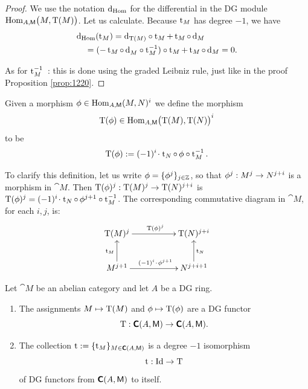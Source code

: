 \begin{proof}
We use the notation $\mathrm{d}_{\mathrm{Hom}}$ for the differential in the DG module \lb 
$\operatorname{Hom}_{A, \operatorname{\mathsf{M}}} \bigl( M, \operatorname{T}(M) \bigr)$. 
Let us calculate. Because $\operatorname{t}_M$ has degree $-1$, we have
\[ \begin{aligned}
& \mathrm{d}_{\mathrm{Hom}}(\operatorname{t}_M) = 
\mathrm{d}_{\operatorname{T}(M)} \circ  \operatorname{t}_M + \operatorname{t}_M \circ \, \mathrm{d}_{M}
\\ & \quad 
=  (- \operatorname{t}_M \circ \, \mathrm{d}_M^{} \circ \operatorname{t}_M^{-1}) 
\circ  \operatorname{t}_M + \operatorname{t}_M \circ \, \mathrm{d}_{M} = 0 . 
\end{aligned} \]

As for $\operatorname{t}_M^{-1}$~: this is done using the graded Leibniz rule, just like 
in the proof  Proposition \ref{prop:1220}.
\end{proof}

\begin{dfn} \label{dfn:1171}
Given a  morphism 
$\phi \in \operatorname{Hom}_{A, \operatorname{\mathsf{M}}} (M, N)^{i}$
we define the morphism 
\[ \operatorname{T}(\phi)  \in 
\operatorname{Hom}_{A, \operatorname{\mathsf{M}}} \bigl( \operatorname{T}(M), \operatorname{T}(N) \bigr)^i \]
to be
\[ \operatorname{T}(\phi) := (-1)^i \mspace{1.5mu}{\cdot}\mspace{1.5mu} \operatorname{t}_N \circ \, \phi \circ 
\operatorname{t}_M^{-1}  .  \]
\end{dfn}

To clarify this definition, let us write 
$\phi = \{ \phi^{ j} \}_{j \in \mathbb{Z}}$, 
so that $\phi^{ j} : M^j \to N^{j + i}$
is a morphism in $\cat{M}$. Then 
$\operatorname{T}(\phi)^{ j} : \operatorname{T}(M)^{ j} \to \operatorname{T}(N)^{ j + i}$
is  
$\operatorname{T}(\phi)^{ j} = (-1)^i \mspace{1.5mu}{\cdot}\mspace{1.5mu} \operatorname{t}_N \circ \, \phi^{ j + 1} 
\circ \operatorname{t}_M^{-1}$.
The corresponding commutative diagram in $\cat{M}$, for each $i, j$, is: 
\begin{equation} \label{eqn:1162}
 \UseTips  \xymatrix @C=12ex @R=6ex {
\opn{T}(M)^{\lms j}
\ar[r]^{\opn{T}(\phi)^{\lms j}}
&
\opn{T}(N)^{\lms j + i}
\\
M^{j + 1}
\ar[u]^{\opn{t}_M}
\ar[r]^{ (-1)^i \cd \phi^{\lms j + 1} }
&
N^{j + i + 1}
\ar[u]_{\opn{t}_N}
}
\end{equation}

\begin{thm} \label{thm:1260} 
Let $\cat{M}$ be an abelian category and let $A$ be a DG ring.
\begin{enumerate}
\item The assignments $M \mapsto \operatorname{T}(M)$ and 
$\phi \mapsto \operatorname{T}(\phi)$ are a  DG functor
\[ \operatorname{T} : \boldsymbol{\mathsf{C}}(A, \operatorname{\mathsf{M}}) \to \boldsymbol{\mathsf{C}}(A, \operatorname{\mathsf{M}}) . \]

\item The collection 
$\operatorname{t} := \{ \operatorname{t}_M \}_{M \in \boldsymbol{\mathsf{C}}(A, \operatorname{\mathsf{M}})}$ 
is a degree $-1$ isomorphism 
\[ \operatorname{t} : \operatorname{Id} \to  \operatorname{T} \]
of DG functors from $\boldsymbol{\mathsf{C}}(A, \operatorname{\mathsf{M}})$ to itself. 
\end{enumerate}
\end{thm}

